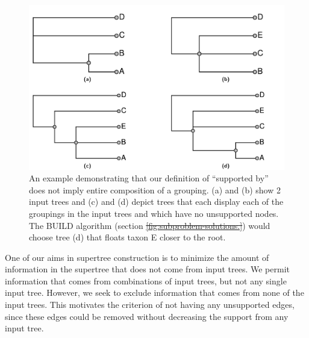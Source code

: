 \documentclass[fleqn,12pt,lineno,english]{wlpeerj}
\providecommand{\DIFaddtex}[1]{{\protect\color{blue}\uwave{#1}}} %
\providecommand{\DIFdeltex}[1]{{\protect\color{red}\sout{#1}}}                      %
\providecommand{\DIFaddFL}[1]{\DIFadd{#1}} %
\providecommand{\DIFdelFL}[1]{\DIFdel{#1}} %
\providecommand{\DIFaddbeginFL}{} %
\providecommand{\DIFaddendFL}{} %
\providecommand{\DIFdelbeginFL}{} %
\providecommand{\DIFdelendFL}{} %
\providecommand{\DIFadd}[1]{\texorpdfstring{\DIFaddtex{#1}}{#1}} %
\providecommand{\DIFdel}[1]{\texorpdfstring{\DIFdeltex{#1}}{}} %
\begin{document}
\begin{figure}
\DIFdelbeginFL %





\DIFdelendFL \DIFaddbeginFL \includegraphics[width=1.0\textwidth]{Fig1}  
\DIFaddendFL 

\caption{An example demonstrating that our definition of ``supported by''
does not imply entire composition of a grouping. (a) and (b) show
2 input trees and (c) and (d) depict trees that each display each
of the groupings in the input trees and which have no unsupported
nodes. The BUILD algorithm (section \DIFdelbeginFL \DIFdelFL{\ref{fig:subproblem-solutions.}}\DIFdelendFL \DIFaddbeginFL \DIFaddFL{\ref{subsec:Subproblem-solution}}\DIFaddendFL )
would choose tree (d) that floats taxon E closer to the root.}

\label{fig:toyambig}
\end{figure}

One of our aims in supertree construction is to minimize the amount
of information in the supertree that does not come from input trees.
We permit information that comes from combinations of input trees,
but not any single input tree. However, we seek to exclude information
that comes from none of the input trees. This motivates the criterion
of not having any unsupported edges, since these edges could be removed
without decreasing the support from any input tree.
\end{document}
